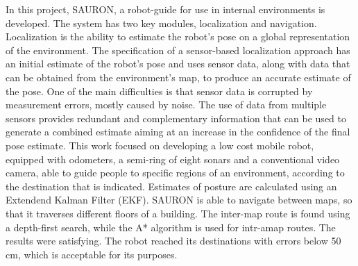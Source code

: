 In this project, SAURON, a robot-guide for use in internal environments is developed. The system has two key modules, localization and navigation. Localization is the ability to estimate the robot's pose on a global representation of the environment. The specification of a sensor-based localization approach has an initial estimate of the robot's pose and uses sensor data, along with data that can be obtained from the environment's map, to produce an accurate estimate of the pose. One of the main difficulties is that sensor data is corrupted by measurement errors, mostly caused by noise. The use of data from multiple sensors provides redundant and complementary information that can be used to generate a combined estimate aiming at an increase in the confidence of the final pose estimate. This work focused on developing a low cost mobile robot, equipped with odometers, a semi-ring of eight sonars and a conventional video camera, able to guide people to specific regions of an environment, according to the destination that is indicated. Estimates of posture are calculated using an Extendend Kalman Filter (EKF). SAURON is able to navigate between maps, so that it traverses different floors of a building. The inter-map route is found using a depth-first search, while the A* algorithm is used for intr-amap routes. The results were satisfying. The robot reached its destinations with errors below 50 cm, which is acceptable for its purposes.